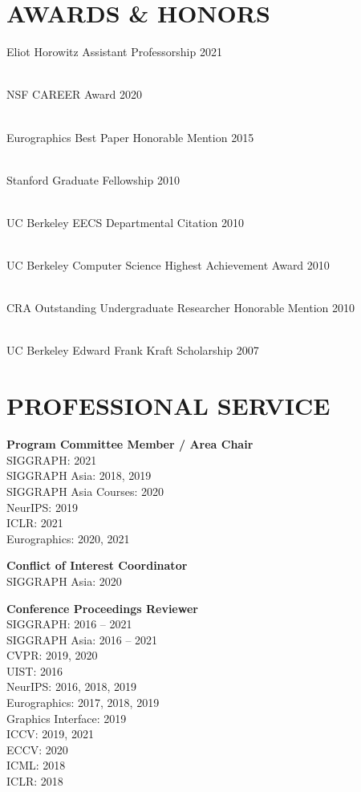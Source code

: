 \documentclass[line,margin]{res}
\begin{document}
\begin{resume}
\section{AWARDS \& HONORS}

\newcommand{\award}[2] {
	#1 \hfill #2
}

\award
{Eliot Horowitz Assistant Professorship}
{2021}
\\
\award
{NSF CAREER Award}
{2020}
\\
\award
{Eurographics Best Paper Honorable Mention}
{2015}
\\
\award
{Stanford Graduate Fellowship}
{2010}
\\
\award
{UC Berkeley EECS Departmental Citation}
{2010}
\\
\award
{UC Berkeley Computer Science Highest Achievement Award}
{2010}
\\
\award
{CRA Outstanding Undergraduate Researcher Honorable Mention}
{2010}
\\
\award
{UC Berkeley Edward Frank Kraft Scholarship}
{2007}


\section{PROFESSIONAL SERVICE}

\textbf{Program Committee Member / Area Chair}\\
SIGGRAPH: 2021\\
SIGGRAPH Asia: 2018, 2019\\
SIGGRAPH Asia Courses: 2020\\
NeurIPS: 2019\\
ICLR: 2021\\
Eurographics: 2020, 2021

\textbf{Conflict of Interest Coordinator}\\
SIGGRAPH Asia: 2020

\textbf{Conference Proceedings Reviewer}\\
SIGGRAPH: 2016 -- 2021\\
SIGGRAPH Asia: 2016 -- 2021\\
CVPR: 2019, 2020\\
UIST: 2016\\
NeurIPS: 2016, 2018, 2019\\
Eurographics: 2017, 2018, 2019\\
Graphics Interface: 2019\\
ICCV: 2019, 2021\\
ECCV: 2020\\
ICML: 2018\\
ICLR: 2018


\end{resume}
\end{document}
